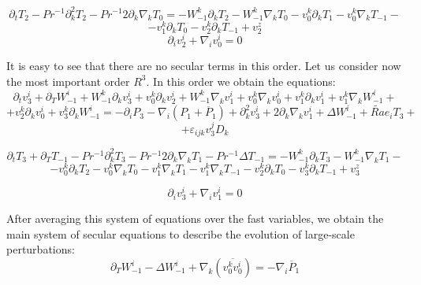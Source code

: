 \documentclass [12pt]{article}
\begin{document}
\[\partial _{t} T_{2} -Pr^{-1} \partial _{k}^{2} T_{2} -Pr^{-1} 2\partial _{k} \nabla
_{k} T_{0} =-W_{-1}^{k} \partial _{k} T_{2} -W_{-1}^{k} \nabla _{k} T_{0} -v_{0}^{k}
\partial _{k} T_{1} -v_{0}^{k} \nabla _{k} T_{-1}-\]
\begin{equation}\label{eqI20} {-v_{1}^{k} \partial _{k}
T_{0} -v_{2}^{k} \partial _{k} T_{-1} +v_{2}^{z} }  \end{equation}                                                                                                                                                                                                                                       \begin{equation}\label{eqI21} \partial_{i} v_{2}^{i} +\nabla _{i} v_{0}^{i} =0 \end{equation}

It is easy to see that there are no secular terms in this order. Let us consider now the most important order $R^{3} $. In this order we obtain the equations:
 \[\partial _{t} v_{3}^{i} +\partial _{T} W_{-1}^{i} +W_{-1}^{k}
\partial _{k} v_{3}^{i} +v_{0}^{k} \partial _{k} v_{2}^{i} +W_{-1}^{k} \nabla _{k}
v_{1}^{i} +v_{0}^{k} \nabla _{k} v_{0}^{i} +v_{1}^{k} \partial _{k} v_{1}^{i} +v_{1}^{k}
\nabla _{k} W_{-1}^{i} +\]
 \[+v_{2}^{k} \partial _{k} v_{0}^{i}+v_{3}^{k} \partial _{k} W_{-1}^{i}=-\partial _{i}
P_{3} -\nabla _{i} \left(P_{1} +\overline{P}_{1} \right)+\partial _{k}^{2} v_{3}^{i}
+2\partial _{k} \nabla _{k} v_{1}^{i} +\Delta W_{-1}^{i} +\widetilde{Ra}e_{i} T_{3}
 +\]
\begin{equation}\label{eqI22} {+{\varepsilon }_{ijk} {v}_{3}^{j}
{D}_{k} }  \end{equation}

\[\partial _{t} T_{3} +\partial _{T} T_{-1} -Pr^{-1} \partial _{k}^{2}
T_{3} -Pr^{-1} 2\partial _{k} \nabla _{k} T_{1} -Pr^{-1} \Delta T_{-1} =-W_{-1}^{k}
\partial _{k} T_{3} -W_{-1}^{k} \nabla _{k} T_{1} -\]
\begin{equation}\label{eqI23} {-v_{0}^{k} \partial _{k} T_{2} -v_{0}^{k} \nabla _{k} T_{0} -v_{1}^{k} \nabla _{k} T_{1} -v_{1}^{k} \nabla_{k} T_{-1} -v_{2}^{k} \partial _{k} T_{0} -v_{3}^{k} \partial _{k} T_{-1} +v_{3}^{z}
} \end{equation}


\begin{equation}\label{eqI24}\partial _{i} v_{3}^{i} +\nabla _{i} v_{1}^{i} =0 \end{equation}

After averaging this system of equations over the fast variables, we obtain the main system of secular equations to describe the evolution of large-scale perturbations:
 \begin{equation}\label{eqI25} \partial _{T} W_{-1}^{i} -\Delta W_{-1}^{i} +\nabla _{k} \left(\overline{v_{0}^{k}
v_{0}^{i} }\right)=-\nabla _{i} \overline{P}_{1} \end{equation}
\end{document}

